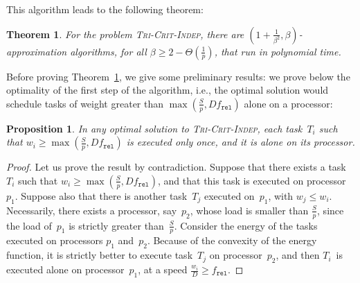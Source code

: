 \documentclass[a4paper]{article}
\theoremstyle{plain}
\newtheorem{theorem}{Theorem}
\newtheorem{proposition}{Proposition}
\theoremstyle{definition}
\theoremstyle{remark}
\newcommand{\fr}{\ensuremath{f_{\texttt{rel}}}\xspace}
\newcommand{\indep}{\textsc{Tri-Crit-In\-dep}\xspace}
\let\ab\allowbreak
\begin{document}
\medskip
This algorithm leads to the following theorem: 

\begin{theorem}
    \label{thm.indep}
For the problem \indep, there are
$\left(1+\frac{1}{\beta^2},\beta \right)$-approxi\-mation
algorithms, for all $\beta \geq 2-\Theta(\frac{1}{p})$, that run in
polynomial time.
\end{theorem}




Before proving Theorem~\ref{thm.indep}, we give some preliminary
results: we prove below the optimality of the first step of the
algorithm, i.e., the optimal solution would schedule tasks of weight
greater than $\max(\frac{S}{p},D\fr)$ alone on a processor:

\begin{proposition}
  \label{prop.grobt}
  In any optimal solution to \indep, each task~$T_i$ such that $w_i \geq \max(\frac{S}{p},D\fr)$ 
is executed only once, 
and it is alone on its processor.
\end{proposition}

\begin{proof}
  Let us prove the result by contradiction.  Suppose that there exists
  a task~$T_i$ such that $w_i \geq \max(\frac{S}{p},\ab D\fr)$, and that
  this task is executed on processor~$p_1$.  Suppose also that there
  is another task~$T_j$ executed on~$p_1$, with $w_j \leq w_i$.
  Necessarily, there exists a processor, say~$p_2$, whose load is
  smaller than $\frac{S}{p}$, since the load of~$p_1$ is strictly
  greater than~$\frac{S}{p}$.
Consider the energy of the tasks executed on processors $p_1$
  and~$p_2$. Because of the convexity of the energy function, it is
  strictly better to execute task~$T_j$ on processor~$p_2$, and then
  $T_i$~is executed alone on processor~$p_1$, at a speed
  $\frac{w_i}{D} \geq \fr$.  \end{proof}

\begin{comment}
\begin{proposition}
    \label{prop.sizereex}
For the problem \indep, if a task $T_i$ is replicated or re-executed, then 
necessarily, $w_i<\frac{1}{\sqrt{2}}D\fr$.
\end{proposition}
\begin{proof}
  Since at least one of the execution of the task should be at a speed
  lower than $\frac{1}{\sqrt{2}}\fr$ (otherwise we would not have a
  better energy than one execution at \fr), and since the deadline is
  $D$, in order to match the deadline the weight of the task has to be
  strictly lower than $\frac{1}{\sqrt{2}}D\fr$. 
\end{proof}
\end{comment}
\end{document}
